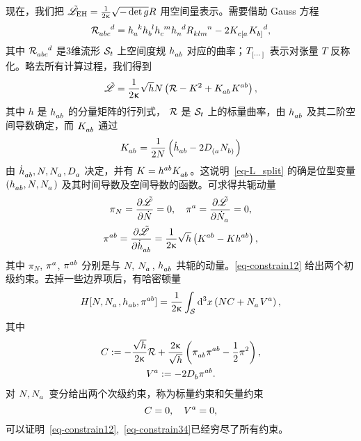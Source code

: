 		现在，我们把 $\tilde{\mathscr{L}}_{\text{EH}} = \frac{1}{2\upkappa} \sqrt{- \det g} {R}$ 用空间量表示。需要借助 Gauss 方程
		\begin{equation}
			\tensor{\spacecurR}{_a_b_c^d} = \tensor{h}{_a^k} \tensor{h}{_b^l} \tensor{h}{_c^m} \tensor{h}{_n^d} \tensor{\curR}{_k_l_m^n} - 2 \tensor{K}{_{c[a}} \tensor{K}{_{b]}^d}, \label{eqgauss}
		\end{equation}
		其中 $\tensor{\spacecurR}{_a_b_c^d}$ 是3维流形 $\mathcal{S}_t$ 上空间度规 $\tensor{h}{_a_b}$ 对应的曲率；$\tensor{T}{_{[\cdots]}}$ 表示对张量 $T$ 反称化。略去所有计算过程，我们得到
		\begin{equation}
			\Lad = \frac{1}{2\gkappa} \sqrt{h} N \left( \spacecurR - K^2 + \tensor{K}{_a_b} \tensor{K}{^a^b} \right), \label{eq-L_split}
		\end{equation}
		其中 $h$ 是 $\tensor{h}{_a_b}$ 的分量矩阵的行列式， $\mathcal{R}$ 是 $\mathcal{S}_t$ 上的标量曲率，由 $\tensor{h}{_a_b}$ 及其二阶空间导数确定，而 $\tensor{K}{_a_b}$ 通过
		\begin{equation}
			\tensor{K}{_a_b} = \frac{1}{2N} \left( \tensor{\dot{h}}{_a_b} - 2 \tensor{D}{_{(a}} \tensor{N}{_{b)}} \right)
		\end{equation}
		由 $\tensor{\dot{h}}{_a_b}, N, \tensor{N}{_a}, \spaceD{a}$ 决定，并有 $K = \tensor{h}{^a^b} \tensor{K}{_a_b}$。这说明~\eqref{eq-L_split} 的确是位型变量 $\left( \tensor{h}{_a_b} , N, \tensor{N}{_a} \right)$ 及其时间导数及空间导数的函数。可求得共轭动量
		\begin{gather}
			\pi_N = \pdv{\Lad}{\dot{N}} = 0 \qc \tensor{\pi}{^a} = \pdv{\Lad}{\tensor{\dot{N}}{_a}} = 0, \label{eq-constrain12}\\
			\tensor{\pi}{^a^b} = \pdv{\Lad}{\tensor{\dot{h}}{_a_b}} = \frac{1}{2\gkappa} \sqrt{h} \left( \tensor{K}{^a^b} - K \tensor{h}{^a^b} \right), \label{eq-pi}
		\end{gather}
		其中 $\pi_N$, $\tensor{\pi}{^a}$, $\tensor{\pi}{^a^b}$ 分别是与 $N$, $\tensor{N}{_a}$, $\tensor{h}{_a_b}$ 共轭的动量。\eqref{eq-constrain12} 给出两个初级约束。去掉一些边界项后，有哈密顿量
		\begin{equation}
			H[N,\tensor{N}{_a}, \tensor{h}{_a_b}, \tensor{\pi}{^a^b}] = \frac{1}{2\gkappa} \int_{\spc} \dd[3]{x} \left( N C + \tensor{N}{_a} \tensor{V}{^a} \right), \label{eq-ADM_H}
		\end{equation}
		其中
		\begin{gather}
			C \definedby - \frac{\sqrt{h}}{2\gkappa} \spacecurR + \frac{2\gkappa}{\sqrt{h}} \left( \tensor{\pi}{_a_b} \tensor{\pi}{^a^b} - \frac{1}{2} \pi^2 \right),\\
			\tensor{V}{^a} \definedby -2 \spaceD{b} \tensor{\pi}{^a^b}.
		\end{gather}
		对 $N, \tensor{N}{_a}$ 变分给出两个次级约束，称为标量约束和矢量约束
		\begin{equation}
			C = 0 \qc \tensor{V}{^a} = 0, \label{eq-constrain34}
		\end{equation}
		可以证明~\eqref{eq-constrain12},~\eqref{eq-constrain34}已经穷尽了所有约束。


